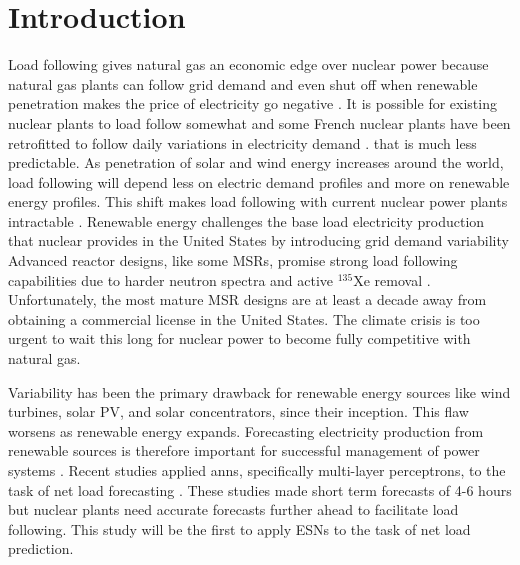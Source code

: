 \section{Introduction}

Load following gives natural gas an economic edge over nuclear power
because natural gas plants can follow grid demand and even shut off when
renewable penetration makes the
price of electricity go negative \cite{keppler_carbon_2011}. It is possible for
existing nuclear plants to load follow somewhat and some French nuclear
plants have been retrofitted to follow daily
variations in electricity demand \cite{lokhov_technical_2011}.
that is much less predictable. As penetration of solar
and wind energy increases around the world, load following will depend less on
electric demand profiles and more on renewable energy profiles. This shift makes
load following with current nuclear power plants intractable \cite{cany_nuclear_2018}.
Renewable energy challenges the base load electricity production that
nuclear provides in the United States by introducing grid demand variability
Advanced reactor designs, like some \glspl{MSR}, promise strong load following
capabilities due to harder
neutron spectra and active $^{135}$Xe removal \cite{rykhlevskii_impact_2019}.
Unfortunately, the most mature MSR
designs are at least a decade away from obtaining a commercial license in the
United States. The climate crisis is too urgent to wait this long for nuclear
power to become fully competitive with natural gas.

Variability has been the primary drawback for renewable energy sources like
wind turbines, solar PV, and solar concentrators, since their inception. This
flaw worsens as renewable energy expands. Forecasting electricity
production from
renewable sources is therefore important for successful management of power
systems \cite{kobylinski_high-resolution_2020}. Recent studies applied
\glspl{ann}, specifically multi-layer perceptrons, to the task of net load
forecasting \cite{kobylinski_high-resolution_2020,dutta_load_2017,lee_development_2016}.
These studies made short term forecasts of 4-6 hours but nuclear plants
need accurate forecasts further ahead to facilitate load following.
This study will be the first to apply \glspl{ESN} to the task of net load
prediction.
